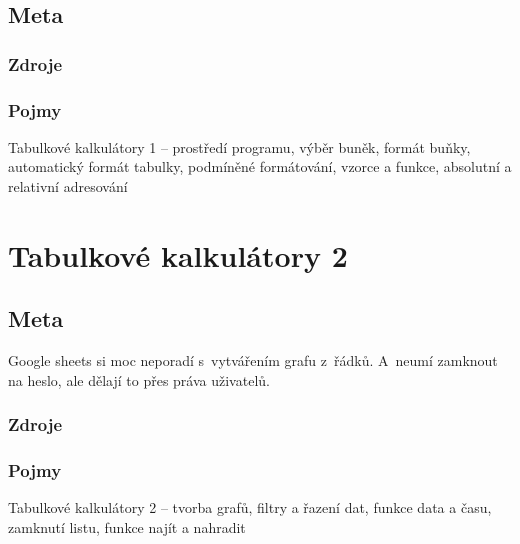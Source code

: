\documentclass[12pt]{article}
\begin{document}
\subsection{Meta}
\subsubsection{Zdroje}
\subsubsection{Pojmy}
Tabulkové kalkulátory 1 – prostředí programu, výběr buněk, formát buňky, automatický formát tabulky, podmíněné formátování, vzorce a funkce, absolutní a relativní adresování

\section{Tabulkové kalkulátory 2}
\subsection{Meta}
Google sheets si moc neporadí s~vytvářením grafu z~řádků. A~neumí zamknout na heslo, ale dělají to přes práva uživatelů.
\subsubsection{Zdroje}
\subsubsection{Pojmy}
Tabulkové kalkulátory 2 – tvorba grafů, filtry a řazení dat, funkce data a času, zamknutí listu, funkce najít a nahradit
\newpage
\tableofcontents
\end{document}
